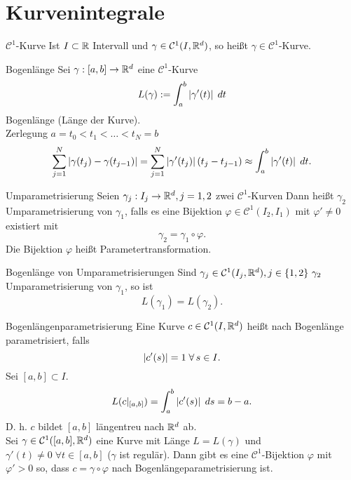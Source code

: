 \documentclass[main.tex]{subfiles}
\begin{document}
\section*{Kurvenintegrale}

\begin{karte}{\( \mathcal{C}^1 \)-Kurve}
    Ist \( I \subset \R \) Intervall und
    \( \gamma \in \mathcal{C}^1(I, \R^d) \),
    so heißt \(\gamma \in \mathcal{C}^1\)-Kurve.
\end{karte}

\begin{karte}{Bogenlänge}
    Sei \(\abb{\gamma}{[a,b]}{\R^d}\) eine \(\mathcal{C}^1\)-Kurve
    \[ L(\gamma) := \integralx{\abs{\gamma'(t)}}{a}{b}{t} \]
    Bogenlänge (Länge der Kurve).\\
    Zerlegung \(a = t_0 < t_1 < \ldots < t_N = b\)
    \[ \sum_{j=1}^N \abs{\gamma(t_j) - \gamma(t_{j-1})} 
    = \sum_{j=1}^N \abs{\gamma'(t_j)} (t_j - t_{j-1}) 
    \approx \integralx{\abs{\gamma'(t)}}{a}{b}{t}. \]
\end{karte}

\begin{karte}{Umparametrisierung}
    Seien \(\abb{\gamma_j}{I_j}{\R^d}, j=1,2 \) zwei \(\mathcal{C}^1\)-Kurven
    Dann heißt \(\gamma_2\) Umparametrisierung von \( \gamma_1 \),
    falls es eine Bijektion \(\varphi \in \mathcal{C}^1(I_2, I_1)\)
    mit \(\varphi' \neq 0 \) existiert mit 
    \[ \gamma_2 = \gamma_1 \circ \varphi. \]
    Die Bijektion \( \varphi \) heißt Parametertransformation.
\end{karte}

\begin{karte}{Bogenlänge von Umparametrisierungen}
    Sind \(\gamma_j \in \mathcal{C}^1(I_j, \R^d), 
    j \in \set{1,2}\ \gamma_2\) Umparametrisierung  
    von \( \gamma_1 \), so ist 
    \[ L(\gamma_1) = L(\gamma_2). \]
\end{karte}

\begin{karte}{Bogenlängenparametrisierung}
    Eine Kurve \(c \in \mathcal{C}^1(I, \R^d)\) heißt nach Bogenlänge
    parametrisiert, falls
    \[ \abs{c'(s)} = 1 \; \forall s \in I. \]
    Sei \( [a,b] \subset I \).
    \[ L(c \vert_{[a,b]}) = \integralx{\abs{c'(s)}}{a}{b}{s}
    = b - a. \]
    D. h. \(c\) bildet \([a,b]\) längentreu nach \(\R^d\) ab.\\
    Sei \( \gamma \in \mathcal{C}^1([a,b],\R^d) \) eine Kurve 
    mit Länge \(L = L(\gamma)\) und \(\gamma'(t) \neq 0 
    \; \forall t \in [a,b] \) (\( \gamma \) ist regulär).
    Dann gibt es eine \(\mathcal{C}^1\)-Bijektion \(\varphi\) 
    mit \( \varphi' > 0 \) so, dass \(c = \gamma \circ \varphi\) nach 
    Bogenlängeparametrisierung ist.
\end{karte}
\end{document}
